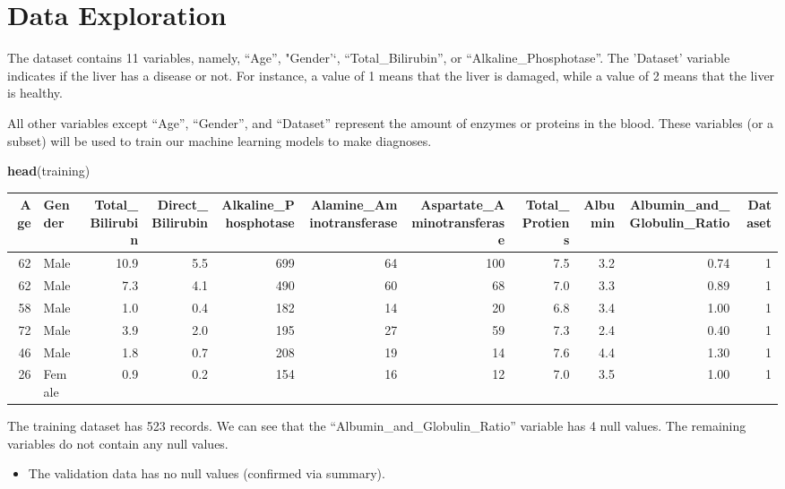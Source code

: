 \documentclass[]{article}
\newenvironment{Shaded}{\begin{snugshade}}{\end{snugshade}}
\newcommand{\KeywordTok}[1]{\textcolor[rgb]{0.13,0.29,0.53}{\textbf{#1}}}
\newcommand{\NormalTok}[1]{#1}
\newcommand{\StringTok}[1]{\textcolor[rgb]{0.31,0.60,0.02}{#1}}
\begin{document}
\section{Data Exploration}
\label{sec:exploration}

The dataset contains 11 variables, namely, ``Age'', "Gender'`,
``Total\_Bilirubin'', or ``Alkaline\_Phosphotase''. The 'Dataset'
variable indicates if the liver has a disease or not. For instance, a
value of 1 means that the liver is damaged, while a value of 2 means
that the liver is healthy.

All other variables except ``Age'', ``Gender'', and ``Dataset''
represent the amount of enzymes or proteins in the blood. These
variables (or a subset) will be used to train our machine learning
models to make diagnoses.

\begin{Shaded}
\begin{Highlighting}[]
\KeywordTok{head}\NormalTok{(training)}
\end{Highlighting}
\end{Shaded}

\begin{longtable}[]{@{}rlrrrrrrrrr@{}}
\toprule
Age & Gender & Total\_Bilirubin & Direct\_Bilirubin &
Alkaline\_Phosphotase & Alamine\_Aminotransferase &
Aspartate\_Aminotransferase & Total\_Protiens & Albumin &
Albumin\_and\_Globulin\_Ratio & Dataset\tabularnewline
\midrule
\endhead
62 & Male & 10.9 & 5.5 & 699 & 64 & 100 & 7.5 & 3.2 & 0.74 &
1\tabularnewline
62 & Male & 7.3 & 4.1 & 490 & 60 & 68 & 7.0 & 3.3 & 0.89 &
1\tabularnewline
58 & Male & 1.0 & 0.4 & 182 & 14 & 20 & 6.8 & 3.4 & 1.00 &
1\tabularnewline
72 & Male & 3.9 & 2.0 & 195 & 27 & 59 & 7.3 & 2.4 & 0.40 &
1\tabularnewline
46 & Male & 1.8 & 0.7 & 208 & 19 & 14 & 7.6 & 4.4 & 1.30 &
1\tabularnewline
26 & Female & 0.9 & 0.2 & 154 & 16 & 12 & 7.0 & 3.5 & 1.00 &
1\tabularnewline
\bottomrule
\end{longtable}

The training dataset has 523 records. We can see that the
``Albumin\_and\_Globulin\_Ratio'' variable has 4 null values. The
remaining variables do not contain any null values.

\begin{itemize}
\item The validation data has no null values (confirmed via summary).
\end{itemize}

\begin{Shaded}
\end{Shaded}
\end{document}
